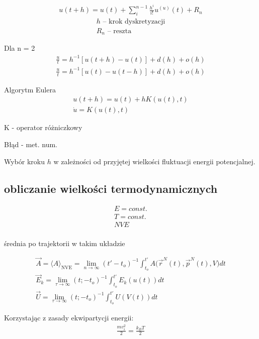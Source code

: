 \documentclass[a4paper,10pt]{article}
\begin{document}
\begin{gather}
 u(t + h) = u(t) + \sum_{i}^{n - 1} \frac{h^i}{i!} u^{(u)}(t) + R_n 
 \end{gather}
 \begin{gather*}
 h \text{ – krok dyskretyzacji} \\
 R_n \text{ – reszta} 
\end{gather*}

Dla n = 2
\begin{gather}
 \frac{u}{t} = h^{-1} \left[ u ( t + h) - u (t) \right] + d(h) + o(h)
\end{gather}
\begin{gather}
 \frac{u}{t} = h^{-1} \left[ u ( t) - u (t - h) \right] + d(h) + o(h)
\end{gather}

Algorytm Eulera
\begin{gather}
 u(t+h) = u(t) + h K(u(t), t) \\
 \dot{u} = K(u(t),t)
\end{gather}

K - operator różniczkowy

Błąd - met. num.

Wybór kroku $h$ w zależności od przyjętej wielkości fluktuacji energii potencjalnej.

\subsection{obliczanie wielkości termodynamicznych}
\begin{gather*}
E = const. \\
T = const. \\
NVE
\end{gather*}
\paragraph{} średnia po trajektorii w takim układzie

\begin{gather*}
 \vec{A} = \langle A \rangle_{\text{NVE}} = \lim_{n \to \infty} (t' - t_o)^{-1} \int_{t_o}^{t'} A\big(\vec{r}^N(t), \vec{p}^N(t), V \big) dt\\
 \vec{E}_k = \lim_{\tau \to \infty} (t; - t_o)^{-1} \int_{t_o}^{t'} E_k(u(t))dt \\
 \vec{U} = \lim_{\tau \to \infty} (t; - t_o)^{-1} \int_{t_o}^{t'} U(V(t))dt
\end{gather*}

Korzystając z zasady ekwipartycji energii:
\begin{gather*}
 \frac{mv_i^2}{2} = \frac{k_BT}{2}
\end{gather*}
\end{document}

